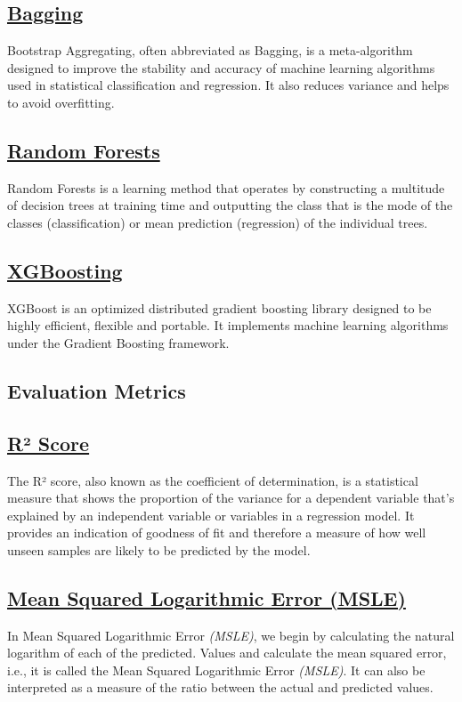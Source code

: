 \documentclass[conference]{IEEEtran}
\begin{document}
    \subsection{\href{https://en.wikipedia.org/wiki/Bootstrap_aggregating}{Bagging}}
    Bootstrap Aggregating, often abbreviated as Bagging, is a meta-algorithm designed to improve the stability and accuracy of machine learning algorithms used in statistical classification and regression. It also reduces variance and helps to avoid overfitting.
    \subsection{\href{https://en.wikipedia.org/wiki/Random_forest}{Random Forests}}
    Random Forests is a learning method that operates by constructing a multitude of decision trees at training time and outputting the class that is the mode of the classes (classification) or mean prediction (regression) of the individual trees.

    \subsection{\href{https://en.wikipedia.org/wiki/XGBoost}{XGBoosting}}
    XGBoost is an optimized distributed gradient boosting library designed to be highly efficient, flexible and portable. It implements machine learning algorithms under the Gradient Boosting framework.

    \subsection*{Evaluation Metrics}

    \subsection*{\href{https://en.wikipedia.org/wiki/Coefficient_of_determination}{R² Score}}
        The R² score, also known as the coefficient of determination, is a statistical measure that shows the proportion of the variance for a dependent variable that's explained by an independent variable or variables in a regression model. It provides an indication of goodness of fit and therefore a measure of how well unseen samples are likely to be predicted by the model.



    \subsection*{\href{https://insideaiml.com/blog/MeanSquared-Logarithmic-Error-Loss-1035}{Mean Squared Logarithmic Error (MSLE)}}
        In Mean Squared Logarithmic Error \textit{(MSLE)}, we begin by calculating the natural logarithm of each of the predicted. Values and calculate the mean squared error, i.e., it is called the Mean Squared Logarithmic Error \textit{(MSLE)}.
        It can also be interpreted as a measure of the ratio between the actual and predicted values.
\end{document}
